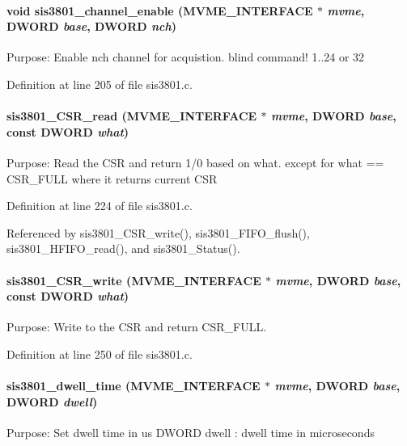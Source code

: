 \paragraph[{sis3801\_\-channel\_\-enable}]{\setlength{\rightskip}{0pt plus 5cm}void sis3801\_\-channel\_\-enable ({\bf MVME\_\-INTERFACE} $\ast$ {\em mvme}, \/  {\bf DWORD} {\em base}, \/  {\bf DWORD} {\em nch})}\hfill\label{sis3801_8c_ace2bca482a33ec77baf90ddadc42b3e4}
Purpose: Enable nch channel for acquistion. blind command! 1..24 or 32 

Definition at line 205 of file sis3801.c.
\paragraph[{sis3801\_\-CSR\_\-read}]{ sis3801\_\-CSR\_\-read ({\bf MVME\_\-INTERFACE} $\ast$ {\em mvme}, \/  {\bf DWORD} {\em base}, \/  const {\bf DWORD} {\em what})}\hfill\label{sis3801_8c_adcfb24a5d2030571cd363fb0d88a3f1e}
Purpose: Read the CSR and return 1/0 based on what. except for what == CSR\_\-FULL where it returns current CSR 

Definition at line 224 of file sis3801.c.

Referenced by sis3801\_\-CSR\_\-write(), sis3801\_\-FIFO\_\-flush(), sis3801\_\-HFIFO\_\-read(), and sis3801\_\-Status().
\paragraph[{sis3801\_\-CSR\_\-write}]{ sis3801\_\-CSR\_\-write ({\bf MVME\_\-INTERFACE} $\ast$ {\em mvme}, \/  {\bf DWORD} {\em base}, \/  const {\bf DWORD} {\em what})}\hfill\label{sis3801_8c_aa9c33c651f53e2fe7bc8f3e38bb33495}
Purpose: Write to the CSR and return CSR\_\-FULL. 

Definition at line 250 of file sis3801.c.
\paragraph[{sis3801\_\-dwell\_\-time}]{ sis3801\_\-dwell\_\-time ({\bf MVME\_\-INTERFACE} $\ast$ {\em mvme}, \/  {\bf DWORD} {\em base}, \/  {\bf DWORD} {\em dwell})}\hfill\label{sis3801_8c_ab88587ea5cc0122596e5e5674293ba01}
Purpose: Set dwell time in us DWORD dwell : dwell time in microseconds 

